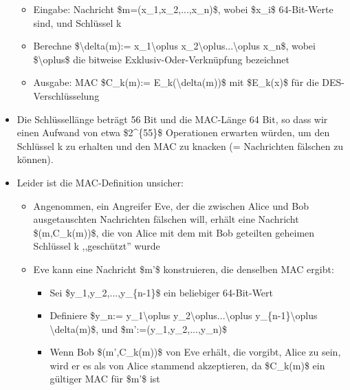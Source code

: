 \documentclass[a4paper]{article}
\begin{document}
\begin{multicols}{3}
\begin{itemize}
              \begin{itemize}
                  \item
                        Eingabe: Nachricht \$m=(x\_1,x\_2,...,x\_n)\$, wobei \$x\_i\$
                        64-Bit-Werte sind, und Schlüssel k
                  \item
                        Berechne \$\textbackslash delta(m):= x\_1\textbackslash oplus
                        x\_2\textbackslash oplus...\textbackslash oplus x\_n\$, wobei
                        \$\textbackslash oplus\$ die bitweise Exklusiv-Oder-Verknüpfung
                        bezeichnet
                  \item
                        Ausgabe: MAC \$C\_k(m):= E\_k(\textbackslash delta(m))\$ mit
                        \$E\_k(x)\$ für die DES-Verschlüsselung
              \end{itemize}
        \item
              Die Schlüssellänge beträgt 56 Bit und die MAC-Länge 64 Bit, so dass
              wir einen Aufwand von etwa \$2\^{}\{55\}\$ Operationen erwarten
              würden, um den Schlüssel k zu erhalten und den MAC zu knacken (=
              Nachrichten fälschen zu können).
        \item
              Leider ist die MAC-Definition unsicher:

              \begin{itemize}
                  \item
                        Angenommen, ein Angreifer Eve, der die zwischen Alice und Bob
                        ausgetauschten Nachrichten fälschen will, erhält eine Nachricht
                        \$(m,C\_k(m))\$, die von Alice mit dem mit Bob geteilten geheimen
                        Schlüssel k ,,geschützt'' wurde
                  \item
                        Eve kann eine Nachricht \$m'\$ konstruieren, die denselben MAC
                        ergibt:

                        \begin{itemize}
                            \item
                                  Sei \$y\_1,y\_2,...,y\_\{n-1\}\$ ein beliebiger 64-Bit-Wert
                            \item
                                  Definiere \$y\_n:= y\_1\textbackslash oplus
                                  y\_2\textbackslash oplus...\textbackslash oplus
                                  y\_\{n-1\}\textbackslash oplus \textbackslash delta(m)\$, und
                                  \$m':=(y\_1,y\_2,...,y\_n)\$
                            \item
                                  Wenn Bob \$(m',C\_k(m))\$ von Eve erhält, die vorgibt, Alice zu
                                  sein, wird er es als von Alice stammend akzeptieren, da
                                  \$C\_k(m)\$ ein gültiger MAC für \$m'\$ ist
                        \end{itemize}
              \end{itemize}
    \end{itemize}



\end{multicols}
\end{document}
